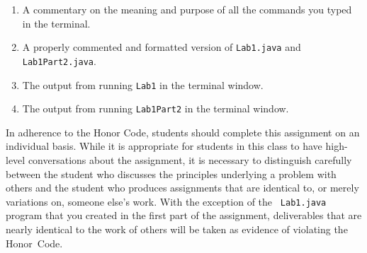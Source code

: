 \documentclass[11pt]{article}
\begin{document}
\vspace*{-.1in}
\begin{enumerate}
  \setlength{\itemsep}{0in}
  \item A commentary on the meaning and purpose of all the commands you typed in the terminal.
  \item A properly commented and formatted version of {\tt Lab1.java} and {\tt Lab1Part2.java}.
  \item The output from running {\tt Lab1} in the terminal window.
  \item The output from running {\tt Lab1Part2} in the terminal window.
\end{enumerate}
\vspace*{-.1in}

In adherence to the Honor Code, students should complete this assignment on an individual basis. While it is appropriate
for students in this class to have high-level conversations about the assignment, it is necessary to distinguish
carefully between the student who discusses the principles underlying a problem with others and the student who produces
assignments that are identical to, or merely variations on, someone else's work.  With the exception of the {\tt
Lab1.java} program that you created in the first part of the assignment, deliverables that are nearly identical to the
work of others will be taken as evidence of violating the \mbox{Honor Code}.


\end{document}
